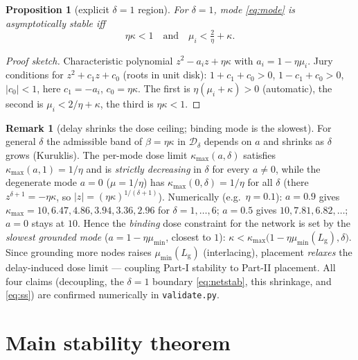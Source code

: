 \documentclass[11pt]{article}
\newtheorem{proposition}{Proposition}
\theoremstyle{definition}
\newtheorem{remark}{Remark}
\newcommand{\Lg}{L_{\mathrm g}}
\begin{document}
\begin{proposition}[explicit $\delta=1$ region]\label{prop:delta1}
For $\delta=1$, mode \eqref{eq:mode} is asymptotically stable iff
\begin{equation}\label{eq:tri}
  \boxed{\;\eta\kappa<1\quad\text{and}\quad \mu_i<\tfrac{2}{\eta}+\kappa.\;}
\end{equation}
\end{proposition}
\begin{proof}[Proof sketch] Characteristic polynomial $z^2-a_i z+\eta\kappa$ with
$a_i=1-\eta\mu_i$. Jury conditions for $z^2+c_1z+c_0$ (roots in unit disk):
$1+c_1+c_0>0$, $1-c_1+c_0>0$, $|c_0|<1$, here $c_1=-a_i$, $c_0=\eta\kappa$.
The first is $\eta(\mu_i+\kappa)>0$ (automatic), the second is $\mu_i<2/\eta+\kappa$, the
third is $\eta\kappa<1$. \end{proof}

\begin{remark}[delay shrinks the dose ceiling; binding mode is the slowest]\label{rem:dose}
For general $\delta$ the admissible band of $\beta=\eta\kappa$ in $\mathcal D_\delta$ depends on
$a$ and shrinks as $\delta$ grows (Kuruklis). The per-mode dose limit $\kappa_{\max}(a,\delta)$
satisfies $\kappa_{\max}(a,1)=1/\eta$ and is \emph{strictly decreasing} in $\delta$ for every
$a\neq 0$, while the degenerate mode $a=0$ ($\mu=1/\eta$) has $\kappa_{\max}(0,\delta)=1/\eta$
for all $\delta$ (there $z^{\delta+1}=-\eta\kappa$, so $|z|=(\eta\kappa)^{1/(\delta+1)}$).
Numerically (e.g.\ $\eta=0.1$): $a=0.9$ gives $\kappa_{\max}=10,6.47,4.86,3.94,3.36,2.96$ for
$\delta=1,\dots,6$; $a=0.5$ gives $10,7.81,6.82,\dots$; $a=0$ stays at $10$. Hence the
\emph{binding} dose constraint for the network is set by the \emph{slowest grounded mode}
($a=1-\eta\mu_{\min}$, closest to $1$): $\kappa<\kappa_{\max}\!\big(1-\eta\mu_{\min}(\Lg),\delta\big)$.
Since grounding more nodes raises $\mu_{\min}(\Lg)$ (interlacing), placement \emph{relaxes} the
delay-induced dose limit --- coupling Part-I stability to Part-II placement. All four claims
(decoupling, the $\delta{=}1$ boundary \eqref{eq:netstab}, this shrinkage, and \eqref{eq:ss})
are confirmed numerically in \texttt{validate.py}.
\end{remark}

\section{Main stability theorem}
\end{document}
